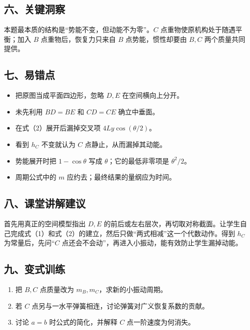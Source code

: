 \documentclass[12pt,a4paper,UTF8]{ctexart}
\newcommand{\tightlist}{\setlength{\itemsep}{0pt}\setlength{\parskip}{0pt}}
\begin{document}
\subsection{六、关键洞察}\label{ux516dux5173ux952eux6d1eux5bdf-1}

本题最本质的结构是``势能不变，但动能不为零''。\(C\)
点重物使原机构处于随遇平衡；加入 \(B\) 点重物后，恢复力只来自 \(B\)
点势能，惯性却要由 \(B,C\) 两个质量共同提供。

\subsection{七、易错点}\label{ux4e03ux6613ux9519ux70b9-1}

\begin{itemize}
\tightlist
\item
  把原图当成平面四边形，忽略 \(D,E\) 在空间横向上分开。
\item
  未先利用 \(BD=BE\) 和 \(CD=CE\) 确立中垂面。
\item
  在式（2）展开后漏掉交叉项 \(4Ly\cos(\theta/2)\)。
\item
  看到 \(h_C\) 不变就认为 \(C\) 点静止，从而漏掉其动能。
\item
  势能展开时把 \(1-\cos\theta\) 写成 \(\theta\)；它的最低非零项是
  \(\theta^2/2\)。
\item
  周期公式中的 \(m\) 应约去；最终结果的量纲应为时间。
\end{itemize}

\subsection{八、课堂讲解建议}\label{ux516bux8bfeux5802ux8bb2ux89e3ux5efaux8bae-1}

首先用真正的空间模型指出 \(D,E\)
的前后或左右层次，再切取对称截面。让学生自己完成式（1）和式（2）的建立，然后只做``两式相减''这一个代数动作。得到
\(h_C\) 为常量后，先问``\(C\)
点还会不会动''，再进入小振动，能有效防止学生漏掉动能。

\subsection{九、变式训练}\label{ux4e5dux53d8ux5f0fux8badux7ec3-1}

\begin{enumerate}
\def\labelenumi{\arabic{enumi}.}
\tightlist
\item
  把 \(B,C\) 点质量改为 \(m_B,m_C\)，求新的小振动周期。
\item
  若 \(C\) 点另与一水平弹簧相连，讨论弹簧对广义恢复系数的贡献。
\item
  讨论 \(a=b\) 时公式的简化，并解释 \(C\) 点一阶速度为何消失。
\end{enumerate}
\end{document}
